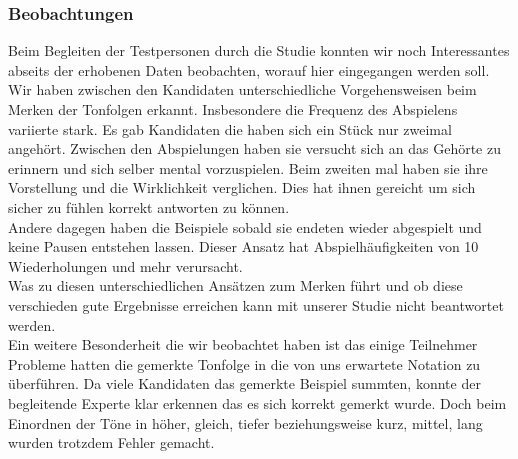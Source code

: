 \documentclass{acm_proc_article-sp}
\begin{document}
\subsubsection{Beobachtungen}
Beim Begleiten der Testpersonen durch die Studie konnten wir noch Interessantes abseits der erhobenen Daten beobachten, worauf hier eingegangen werden soll.\\

Wir haben zwischen den Kandidaten unterschiedliche Vorgehensweisen beim Merken der Tonfolgen erkannt. Insbesondere die Frequenz des Abspielens variierte stark. Es gab Kandidaten die haben sich ein Stück nur zweimal angehört. Zwischen den Abspielungen haben sie versucht sich an das Gehörte zu erinnern und sich selber mental vorzuspielen. Beim zweiten mal haben sie ihre Vorstellung und die Wirklichkeit verglichen. Dies hat ihnen gereicht um sich sicher zu fühlen korrekt antworten zu können.\\
Andere dagegen haben die Beispiele sobald sie endeten wieder abgespielt und keine Pausen entstehen lassen. Dieser Ansatz hat Abspielhäufigkeiten von 10 Wiederholungen und mehr verursacht.\\ 
Was zu diesen unterschiedlichen Ansätzen zum Merken führt und ob diese verschieden gute Ergebnisse erreichen kann mit unserer Studie nicht beantwortet werden.\\

Ein weitere Besonderheit die wir beobachtet haben ist das einige Teilnehmer Probleme hatten die gemerkte Tonfolge in die von uns erwartete Notation zu überführen. Da viele Kandidaten das gemerkte Beispiel summten, konnte der begleitende Experte klar erkennen das es sich korrekt gemerkt wurde. Doch beim Einordnen der Töne in höher, gleich, tiefer beziehungsweise kurz, mittel, lang wurden trotzdem Fehler gemacht.
\end{document}
